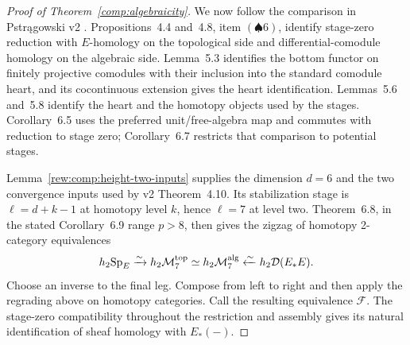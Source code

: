 \begin{proof}[Proof of Theorem~\ref{comp:algebraicity}]
We now follow the comparison in Pstr\k{a}gowski v2
\cite{Pstragowski2021}. Propositions~4.4 and~4.8, item
$(\spadesuit6)$, identify stage-zero reduction with $E$-homology on
the topological side and differential-comodule homology on the
algebraic side. Lemma~5.3 identifies the bottom functor on finitely
projective comodules with their inclusion into the standard comodule
heart, and its cocontinuous extension gives the heart identification.
Lemmas~5.6 and~5.8 identify the heart and the homotopy objects used by
the stages. Corollary~6.5 uses the preferred unit/free-algebra map and
commutes with reduction to stage zero; Corollary~6.7 restricts that
comparison to potential stages.

Lemma~\ref{rew:comp:height-two-inputs} supplies the dimension $d=6$
and the two convergence inputs used by v2 Theorem~4.10. Its
stabilization stage is $\ell=d+k-1$ at homotopy level $k$, hence
$\ell=7$ at level two. Theorem~6.8, in the stated Corollary~6.9 range
$p>8$, then gives the zigzag of homotopy 2-category equivalences
\[
 h_2\mathrm{Sp}_E\xrightarrow{\sim}h_2\mathcal M_7^{\mathrm{top}}
 \simeq h_2\mathcal M_7^{\mathrm{alg}}
 \xleftarrow{\sim}h_2\mathcal D(E_*E).
\]
Choose an inverse to the final leg. Compose from left to right and
then apply the regrading above on homotopy categories. Call the
resulting equivalence $\mathcal F$. The stage-zero compatibility
throughout the restriction and assembly gives its natural identification of
sheaf homology with $E_*(-)$.


\end{proof}
